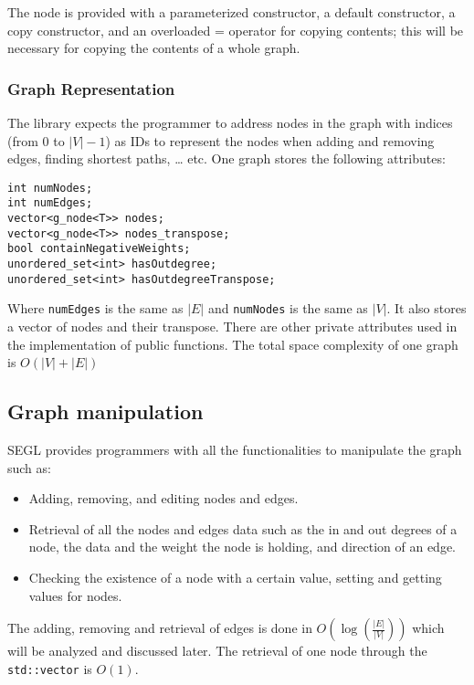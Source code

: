 \documentclass[a4paper,12pt]{article}
\def\code#1{\texttt{#1}}
\begin{document}
The node is provided with a parameterized constructor, a default constructor, a copy constructor, and an overloaded = operator for copying contents; this will be necessary for copying the contents of a whole graph.
\subsubsection{Graph Representation}
The library expects the programmer to address nodes in the graph with indices (from 0 to $|V| - 1$) as IDs to represent the nodes when adding and removing edges, finding shortest paths, … etc.
One graph stores the following attributes:
\begin{lstlisting}
int numNodes;
int numEdges;
vector<g_node<T>> nodes;
vector<g_node<T>> nodes_transpose;
bool containNegativeWeights;
unordered_set<int> hasOutdegree;
unordered_set<int> hasOutdegreeTranspose; 
\end{lstlisting}
Where \code{numEdges} is the same as $|E|$ and \code{numNodes} is the same as $|V|$. It also stores a vector of nodes and their transpose. There are other private attributes used in the implementation of public functions. The total space complexity of one graph is $O\left(|V|+|E|\right)$
\subsection{Graph manipulation}
SEGL provides programmers with all the functionalities to manipulate the graph such as:
\begin{itemize}
    \item Adding, removing, and editing nodes and edges.
\item Retrieval of all the nodes and edges data such as the in and out degrees of a node, the data and the weight the node is holding, and direction of an edge.
\item Checking the existence of a node with a certain value, setting and getting values for nodes. 
\end{itemize}
The adding, removing and retrieval of edges is done in $\displaystyle O\left(\log\left(\frac{|E|}{|V|}\right)\right)$ which will be analyzed and discussed later. The retrieval of one node through the \code{std::vector} is $O(1)$. 



\pic
\end{document}
